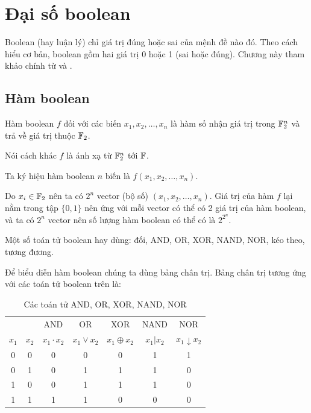 \chapter{Đại số boolean}

Boolean (hay luận lý) chỉ giá trị đúng hoặc sai của mệnh đề nào đó. 
Theo cách hiểu cơ bản, boolean gồm hai giá trị 0 hoặc 1 (sai hoặc đúng). Chương này tham khảo chính từ \cite{Tokareva1} và \cite{Tokareva2}.

\section{Hàm boolean}

Hàm boolean $f$ đối với các biến $x_1, x_2, \ldots, x_n$ là hàm số 
nhận giá trị trong $\mathbb{F}_2^n$ và trả về giá trị thuộc $\mathbb{F}_2$.

Nói cách khác $f$ là ánh xạ từ $\mathbb{F}_2^n$ tới $\mathbb{F}$.

Ta ký hiệu hàm boolean $n$ biến là $f(x_1, x_2, \ldots, x_n)$.

Do $x_i \in \mathbb{F}_2$ nên ta có $2^n$ vector (bộ số)
$(x_1, x_2, \ldots, x_n)$. Giá trị của hàm $f$ lại nằm
trong tập $\{0, 1\}$ nên ứng với mỗi vector có thể có 2 giá 
trị của hàm boolean, và ta có $2^n$ vector nên số lượng hàm
boolean có thể có là $2^{2^n}$.

Một số toán tử boolean hay dùng: đối, AND, OR, XOR, NAND, NOR, 
kéo theo, tương đương.

Để biểu diễn hàm boolean chúng ta dùng bảng chân trị. Bảng chân
trị tương ứng với các toán tử boolean trên là:

\begin{table}[ht]
    \centering
    \begin{tabular}{|c|c|c|c|c|c|c|}
        \hline
        & & AND & OR & XOR & NAND & NOR \\
        $x_1$ & $x_2$ & $x_1 \cdot x_2$ & $x_1 \vee x_2$ &
            $x_1 \oplus x_2$ & $x_1 \vert x_2$ &
            $x_1 \downarrow x_2$ \\
        \hline
        0 & 0 & 0 & 0 & 0 & 1 & 1 \\
        \hline
        0 & 1 & 0 & 1 & 1 & 1 & 0 \\
        \hline
        1 & 0 & 0 & 1 & 1 & 1 & 0 \\
        \hline
        1 & 1 & 1 & 1 & 0 & 0 & 0 \\
        \hline
    \end{tabular}
    \caption{Các toán tử AND, OR, XOR, NAND, NOR}
\end{table}

